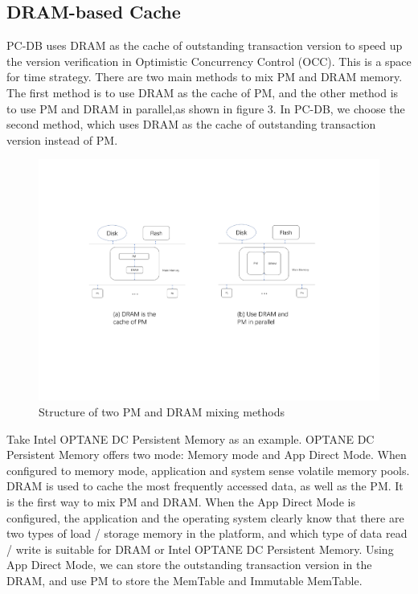 \subsection{DRAM-based Cache}
PC-DB uses DRAM as the cache of outstanding transaction version to speed up the version verification in Optimistic Concurrency Control (OCC). This is a space for time strategy.
There are two main methods to mix PM and DRAM memory. The first method is to use DRAM as the cache of PM, and the other method is to use PM and DRAM in parallel,as shown in figure 3. In PC-DB, we choose the second method, which uses DRAM as the cache of outstanding transaction version instead of PM.
\begin{figure}
    \centering
    \includegraphics[width=0.36\paperwidth]{figure/PM_DRAM.pdf}
    \caption{Structure of two PM and DRAM mixing methods}
    \label{fig:throughput}
\end{figure}
Take Intel OPTANE DC Persistent Memory\cite{OPTANE} as an example. OPTANE DC Persistent Memory offers two mode: Memory mode and App Direct Mode. When configured to memory mode, application and system sense volatile memory pools. DRAM is used to cache the most frequently accessed data, as well as the PM. It is the first way to mix PM and DRAM. When the App Direct Mode is configured, the application and the operating system clearly know that there are two types of load / storage memory in the platform, and which type of data read / write is suitable for DRAM or Intel OPTANE DC Persistent Memory. Using App Direct Mode, we can store the outstanding transaction version in the DRAM, and use PM to store the MemTable and Immutable MemTable.

